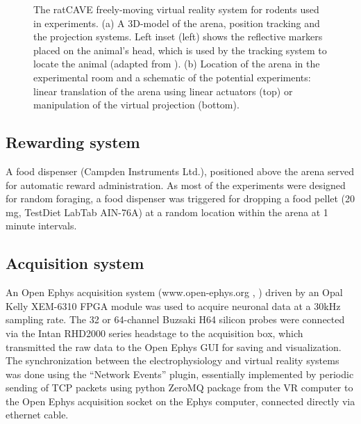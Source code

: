 \begin{figure}
\captionsetup{format=plain}
\caption[VR Setup]{
The ratCAVE freely-moving virtual reality system for rodents used in experiments. (a) A 3D-model of the arena, position tracking and the projection systems. Left inset (left) shows the reflective markers placed on the animal's head, which is used by the tracking system to locate the animal (adapted from \cite{DelGrosso2018}). (b) Location of the arena in the experimental room and a schematic of the potential experiments: linear translation of the arena using linear actuators (top) or manipulation of the virtual projection (bottom).
}
\label{fig:F33_VR_setup}
\end{figure}


\subsection{Rewarding system}

A food dispenser (Campden Instruments Ltd.), positioned above the arena served for automatic reward administration. As most of the experiments were designed for random foraging, a food dispenser was triggered for dropping a food pellet (20 mg, TestDiet LabTab AIN-76A) at a random location within the arena at 1 minute intervals.


\subsection{Acquisition system}

An Open Ephys acquisition system (www.open-ephys.org , \cite{Siegle2017}) driven by an Opal Kelly XEM-6310 FPGA module was used to acquire neuronal data at a 30kHz sampling rate. The 32 or 64-channel Buzsaki H64 silicon probes were connected via the Intan RHD2000 series headstage to the acquisition box, which transmitted the raw data to the Open Ephys GUI for saving and visualization. The synchronization between the electrophysiology and virtual reality systems was done using the “Network Events” plugin, essentially implemented by periodic sending of TCP packets using python ZeroMQ package from the VR computer to the Open Ephys acquisition socket on the Ephys computer, connected directly via ethernet cable.


